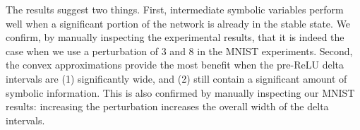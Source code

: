 The results suggest two things.
%
First, intermediate
symbolic variables perform well when a significant portion of the
network is already in the stable state.  We confirm, by manually
inspecting the experimental results, that it is indeed the case when
we use a perturbation of 3 and 8 in the MNIST experiments.
Second, the convex approximations provide the most benefit when the
pre-ReLU delta intervals are (1) significantly wide, and (2) still
contain a significant amount of symbolic information. This is also
confirmed by manually inspecting our MNIST results: increasing the
perturbation increases the overall width of the delta intervals.

%


